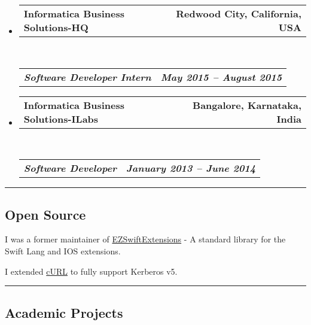 \documentclass[10pt,letterpaper]{article}
\makeatletter
\newcommand{\headerrow}[2]
{\begin{tabular*}{\linewidth}{l@{\extracolsep{\fill}}r}
	#1 &
	#2 \\
\end{tabular*}}
\makeatother
\begin{document}
\begin{itemize}
\begin{itemize*}
\begin{itemize*}
    \end{itemize*}
\end{itemize*}
	\item
		\headerrow
			{\textbf{Informatica Business Solutions-HQ}}
			{\textbf{Redwood City, California, USA}}
		\\
		\headerrow
			{\emph{\textbf{Software Developer Intern}}}
			{\emph{\textbf{May 2015 -- August 2015}}}
	\item
	\headerrow
		{\textbf{Informatica Business Solutions-ILabs}}
		{\textbf{Bangalore, Karnataka, India}}
	\\
	\headerrow
		{\emph{\textbf{Software Developer}}}
		{\emph{\textbf{January 2013 -- June 2014}}}
\end{itemize}

\hrule
\vspace{-0.4em}

\subsection*{Open Source}

\begin{itemize*}
	\item I was a former maintainer of \href{https://github.com/goktugyil/EZSwiftExtensions}{EZSwiftExtensions} - A standard library for the Swift Lang and IOS extensions.
	\item I extended \href{https://github.com/Khalian/curl}{cURL} to fully support Kerberos v5. 
	
\end{itemize*}


\hrule
\vspace{-0.4em}

\subsection*{Academic Projects}
\end{document}
